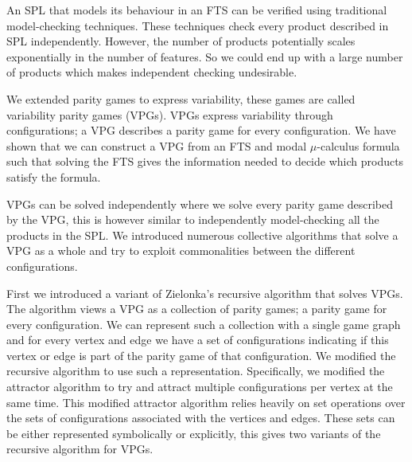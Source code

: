 An SPL that models its behaviour in an FTS can be verified using traditional model-checking techniques. These techniques check every product described in SPL independently. However, the number of products potentially scales exponentially in the number of features. So we could end up with a large number of products which makes independent checking undesirable.

We extended parity games to express variability, these games are called variability parity games (VPGs). VPGs express variability through configurations; a VPG describes a parity game for every configuration. We have shown that we can construct a VPG from an FTS and modal $\mu$-calculus formula such that solving the FTS gives the information needed to decide which products satisfy the formula.

VPGs can be solved independently where we solve every parity game described by the VPG, this is however similar to independently model-checking all the products in the SPL. We introduced numerous collective algorithms that solve a VPG as a whole and try to exploit commonalities between the different configurations.

First we introduced a variant of Zielonka's recursive algorithm that solves VPGs. The algorithm views a VPG as a collection of parity games; a parity game for every configuration. We can represent such a collection with a single game graph and for every vertex and edge we have a set of configurations indicating if this vertex or edge is part of the parity game of that configuration. We modified the recursive algorithm to use such a representation. Specifically, we modified the attractor algorithm to try and attract multiple configurations per vertex at the same time. This modified attractor algorithm relies heavily on set operations over the sets of configurations associated with the vertices and edges. These sets can be either represented symbolically or explicitly, this gives two variants of the recursive algorithm for VPGs.

